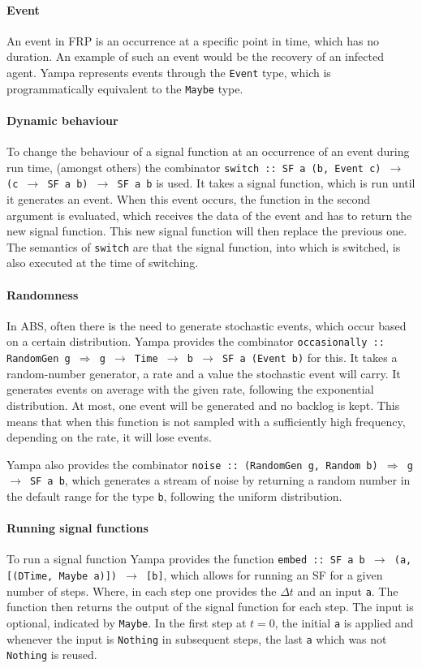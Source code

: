 \paragraph{Event}
An event in FRP is an occurrence at a specific point in time, which has no duration. An example of such an event would be the recovery of an infected agent. Yampa represents events through the \texttt{Event} type, which is programmatically equivalent to the \texttt{Maybe} type. 

\paragraph{Dynamic behaviour}
To change the behaviour of a signal function at an occurrence of an event during run time, (amongst others) the combinator \texttt{switch :: SF a (b, Event c) $\rightarrow$ (c $\rightarrow$ SF a b) $\rightarrow$ SF a b} is used. It takes a signal function, which is run until it generates an event. When this event occurs, the function in the second argument is evaluated, which receives the data of the event and has to return the new signal function. This new signal function will then replace the previous one. The semantics of \texttt{switch} are that the signal function, into which is switched, is also executed at the time of switching.

\paragraph{Randomness}
In ABS, often there is the need to generate stochastic events, which occur based on a certain distribution. Yampa provides the combinator \texttt{occasionally :: RandomGen g $\Rightarrow$ g $\rightarrow$ Time $\rightarrow$ b $\rightarrow$ SF a (Event b)} for this. It takes a random-number generator, a rate and a value the stochastic event will carry. It generates events on average with the given rate, following the exponential distribution. At most, one event will be generated and no backlog is kept. This means that when this function is not sampled with a sufficiently high frequency, depending on the rate, it will lose events.

Yampa also provides the combinator \texttt{noise :: (RandomGen g, Random b) $\Rightarrow$ g $\rightarrow$ SF a b}, which generates a stream of noise by returning a random number in the default range for the type \texttt{b}, following the uniform distribution.

\paragraph{Running signal functions}
To run a signal function Yampa provides the function \texttt{embed :: SF a b $\rightarrow$ (a, [(DTime, Maybe a)]) $\rightarrow$ [b]}, which allows for running an SF for a given number of steps. Where, in each step one provides the $\Delta t$ and an input \texttt{a}. The function then returns the output of the signal function for each step. The input is optional, indicated by \texttt{Maybe}. In the first step at $t = 0$, the initial \texttt{a} is applied and whenever the input is \texttt{Nothing} in subsequent steps, the last \texttt{a} which was not \texttt{Nothing} is reused.

